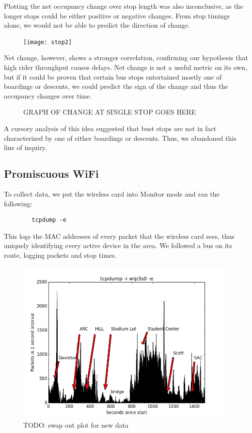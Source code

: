 \documentclass[letterpaper,english]{scrartcl}
\begin{document}
	Plotting the net occupancy change over stop length was also inconclusive, as the longer stops could be either positive or negative changes.
	From stop timings alone, we would not be able to predict the direction of change.

	\begin{figure}[H]
	\texttt{[image: stop2]}
	\centering
	\end{figure}

	Net change, however, shows a stronger correlation, confirming our hypothesis that high rider throughput causes delays.
	Net change is not a useful metric on its own, but if it could be proven that certain bus stops entertained mostly one of boardings or descents, we could predict the sign of the change and thus the occupancy changes over time.

	\begin{figure}[H]
	GRAPH OF CHANGE AT SINGLE STOP GOES HERE
	\centering
	\end{figure}

	A cursory analysis of this idea suggested that bust stops are not in fact characterized by one of either boardings or descents.
	Thus, we abandoned this line of inquiry.


\subsection*{Promiscuous WiFi}
	To collect data, we put the wireless card into Monitor mode and ran the following:
	\begin{verbatim}
		tcpdump -e
	\end{verbatim}
	This logs the MAC addresses of every packet that the wireless card sees, thus uniquely identifying every active device in the area.
	We followed a bus on its route, logging packets and stop times.

	\begin{figure}[H]
	\includegraphics[width=11cm]{packets}
	\\TODO: swap out plot for new data
	\centering
	\end{figure}
\end{document}
